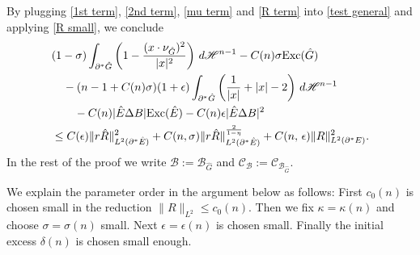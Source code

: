 \documentclass[reqno,11pt]{amsart}
\def\ez{\epsilon}
\def\sz{\sigma}
\numberwithin{equation}{section}
\theoremstyle{remark}
\begin{document}
By plugging \eqref{1st term}, \eqref{2nd term}, \eqref{mu term} and \eqref{R term} into \eqref{test general} and applying \eqref{R small}, we conclude
\begin{align}
 & (1-\sz)  \int_{\partial^* \hat G}   \left(1-\frac{(x\cdot \nu_{\hat G})^2}{|x|^2}\right) \, d\mathscr H^{n-1} -C(n)\sz{\rm Exc}(\hat G) \nonumber \\
 & \quad -(n-1+C(n)\sz)(1+\ez)\int_{\partial^* \hat G}   \left(\frac{1}{|x|}+|x|-2\right)\, d\mathscr H^{n-1} \nonumber  \\ 
& \quad \quad
- C(n )  |\hat E\Delta B| {\rm Exc}(\hat E) -C(n)\ez |\hat E\Delta B|^2  \nonumber \\
&\le    C(\ez) \|r \hat R\|^2_{L^2(\partial^* \hat  E)} +C(n,\sz)  \|r \hat R\|_{L^2(\partial^* \hat E)}^{\frac{2}{1-\eta}} + C(n,\,\ez)  \| R\|^2_{L^2(\partial^*E)}. \label{final estimate}
\end{align}
In the rest of the proof we write
$\mathcal B:=\mathcal B_{\hat G}$ and
$\mathcal C_{\mathcal B}:=\mathcal C_{\mathcal B_{\hat G}}$.

We explain the parameter order in the argument below as follows: First $c_0(n)$  is chosen small in the reduction $\|R\|_{L^2}\le c_0(n)$. Then we fix $\kappa=\kappa(n)$ and choose $\sigma=\sigma(n)$ small. Next $\epsilon=\epsilon(n)$ is chosen small. Finally the initial excess $\delta(n)$ is chosen small enough.
\end{document}
